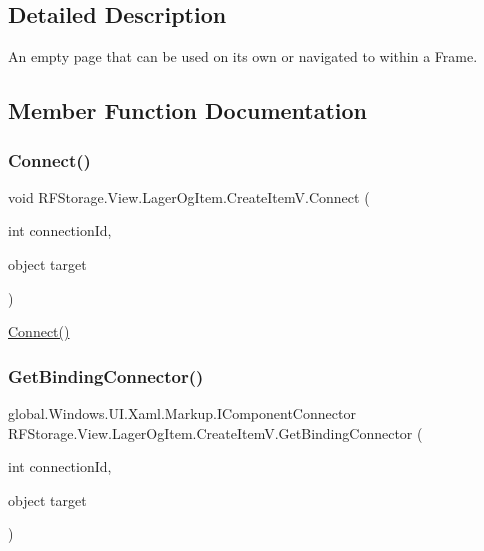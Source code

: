 \subsection{Detailed Description}
An empty page that can be used on its own or navigated to within a Frame. 



\subsection{Member Function Documentation}
\mbox{\label{class_r_f_storage_1_1_view_1_1_lager_og_item_1_1_create_item_v_abe087810b1f2c8588885af501ab3a229}} 
\subsubsection{\texorpdfstring{Connect()}{Connect()}}
{\footnotesize\ttfamily void R\+F\+Storage.\+View.\+Lager\+Og\+Item.\+Create\+Item\+V.\+Connect (\begin{DoxyParamCaption}\item[{int}]{connection\+Id,  }\item[{object}]{target }\end{DoxyParamCaption})}



\mbox{\hyperlink{class_r_f_storage_1_1_view_1_1_lager_og_item_1_1_create_item_v_abe087810b1f2c8588885af501ab3a229}{Connect()}} 

\mbox{\label{class_r_f_storage_1_1_view_1_1_lager_og_item_1_1_create_item_v_a1d517cdbb57baa678467edcba7a2c6d6}} 
\subsubsection{\texorpdfstring{GetBindingConnector()}{GetBindingConnector()}}
{\footnotesize\ttfamily global.\+Windows.\+U\+I.\+Xaml.\+Markup.\+I\+Component\+Connector R\+F\+Storage.\+View.\+Lager\+Og\+Item.\+Create\+Item\+V.\+Get\+Binding\+Connector (\begin{DoxyParamCaption}\item[{int}]{connection\+Id,  }\item[{object}]{target }\end{DoxyParamCaption})}



